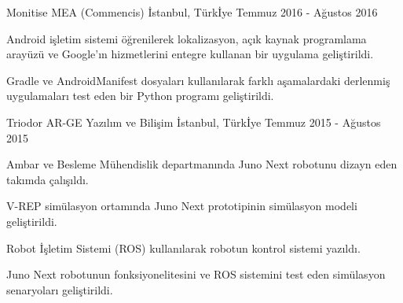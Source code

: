 \documentclass[12pt, a4paper]{awesome-cv_turkish}
\begin{document}
\begin{cventries}
{Monitise MEA (Commencis)}
{İstanbul, Türkİye}
{Temmuz 2016 - Ağustos 2016 }
{
  \begin{cvitems}
    \item {Android işletim sistemi öğrenilerek lokalizasyon, açık kaynak programlama arayüzü ve Google'ın hizmetlerini entegre kullanan bir uygulama geliştirildi.}
    \item {Gradle ve AndroidManifest dosyaları kullanılarak farklı aşamalardaki derlenmiş uygulamaları test eden bir Python programı geliştirildi.}
  \end{cvitems}
}
{Triodor AR-GE Yazılım ve Bilişim}
{İstanbul, Türkİye}
{Temmuz 2015 - Ağustos 2015}{
  \begin{cvitems}
    \item {Ambar ve Besleme Mühendislik departmanında Juno Next robotunu dizayn eden takımda çalışıldı.}
    \item {V-REP simülasyon ortamında Juno Next prototipinin simülasyon modeli geliştirildi.}
    \item {Robot İşletim Sistemi (ROS) kullanılarak robotun kontrol sistemi yazıldı.}
    \item {Juno Next robotunun fonksiyonelitesini ve ROS sistemini test eden simülasyon senaryoları geliştirildi.}
  \end{cvitems}
}
\end{cventries}
\end{document}
